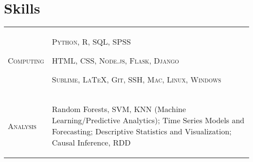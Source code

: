 \documentclass[a4paper,10pt]{article}
\begin{document}
\section{Skills}
\begin{supertabular}{p{3.4cm} p{13.9cm}}

	\textsc{Computing}			& \begin{enumerate*}[label =$\diamond$, itemjoin={\newline}]
																\item \small \textsc{Python, R, SQL, SPSS}
																\item \small \textsc{HTML, CSS, Node.js, Flask, Django}
																\item \small \textsc{Sublime, {\fb \LaTeX}, Git, SSH, Mac, Linux, Windows }
																\end{enumerate*} \vspace{2mm} \\


	\textsc{Analysis}				& \begin{enumerate*}[label =$\diamond$, itemjoin={\newline}]
                                \item \small Random Forests, SVM, KNN (Machine Learning/Predictive Analytics); Time Series Models and Forecasting; Descriptive Statistics and Visualization; Causal Inference, RDD \end{enumerate*}  \vspace{1mm} \\



\end{supertabular}




\end{document}

